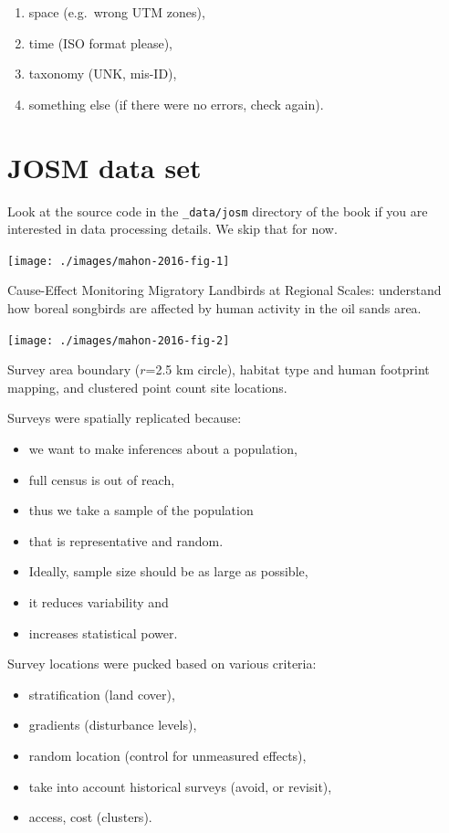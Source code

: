 \documentclass[12pt,]{book}
\providecommand{\tightlist}{%
  \setlength{\itemsep}{0pt}\setlength{\parskip}{0pt}}
\begin{document}
\begin{enumerate}
\def\labelenumi{\arabic{enumi}.}
\tightlist
\item
  space (e.g.~wrong UTM zones),
\item
  time (ISO format please),
\item
  taxonomy (UNK, mis-ID),
\item
  something else (if there were no errors, check again).
\end{enumerate}

\hypertarget{josm-data-set}{%
\section{JOSM data set}\label{josm-data-set}}

Look at the source code in the \texttt{\_data/josm} directory of the book
if you are interested in data processing details.
We skip that for now.

\texttt{[image: ./images/mahon-2016-fig-1]}

Cause-Effect Monitoring Migratory Landbirds at Regional Scales:
understand how boreal songbirds are affected by human activity in the oil sands area.

\texttt{[image: ./images/mahon-2016-fig-2]}

Survey area boundary (\(r\)=2.5 km circle), habitat type and human footprint mapping,
and clustered point count site locations.

Surveys were spatially replicated because:

\begin{itemize}
\tightlist
\item
  we want to make inferences about a population,
\item
  full census is out of reach,
\item
  thus we take a sample of the population
\item
  that is representative and random.
\item
  Ideally, sample size should be as large as possible,
\item
  it reduces variability and
\item
  increases statistical power.
\end{itemize}

Survey locations were pucked based on various criteria:

\begin{itemize}
\tightlist
\item
  stratification (land cover),
\item
  gradients (disturbance levels),
\item
  random location (control for unmeasured effects),
\item
  take into account historical surveys (avoid, or revisit),
\item
  access, cost (clusters).
\end{itemize}
\end{document}
